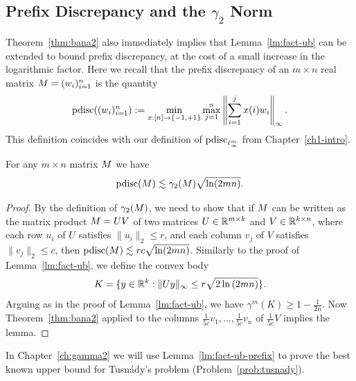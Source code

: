 


\subsection{Prefix Discrepancy and the $\gamma_2$ Norm}

Theorem~\ref{thm:bana2} also immediately implies that
Lemma~\ref{lm:fact-ub} can be extended to bound prefix discrepancy, at
the cost of a small increase in the logarithmic factor. Here we recall
that the prefix discrepancy of an $m\times n$ real matrix $M = (w_i)_{i=1}^n$ is
the quantity
\[
  \operatorname{pdisc}((w_i)_{i = 1}^n) :=
  \min_{x:[n]\to\{-1,+1\}}\max_{j=1}^n \left\|\sum_{i = 1}^jx(i)w_i \right\|_\infty.
\]
This definition coincides with our definition of
$\operatorname{pdisc}_{\ell_\infty^m}$ from Chapter~\ref{ch1-intro}.


\begin{lemma}\label{lm:fact-ub-prefix}
  For any $m\times n$ matrix $M$ 
  we have
  \[
  \operatorname{pdisc}(M) \lesssim \gamma_2(M) \sqrt{\ln(2mn)}.
  \]   
\end{lemma}
\begin{proof}
  By the definition of $\gamma_2(M)$, we need to show  that if $M$ can be written as the matrix
  product $M = UV$ of two matrices $U \in \mathbb{R}^{m\times k}$ and $V\in
  \mathbb{R}^{k\times n}$, where each row
  $u_i$ of $U$ satisfies $\|u_i\|_2 \le r$, and each column $v_j$ of
  $V$ satisfies $\|v_j\|_2 \le c$, then $\operatorname{pdisc}(M) \lesssim rc\sqrt{\ln(2mn)}$.
  Similarly to the proof of Lemma~\ref{lm:fact-ub}, we define the convex body
  \[
    K = \{ y \in \mathbb{R}^k: \|Uy \|_{\infty} \leq r\sqrt{2\ln{(2mn)}}  \}.
  \]
  Arguing as in the proof of Lemma~\ref{lm:fact-ub},
  we have $\gamma^m(K) \ge 1 - \frac{1}{2n}$.
  Now Theorem~\ref{thm:bana2} applied to the columns $\frac{1}{5c}v_1,
  \ldots, \frac{1}{5c}v_n$ of $\frac{1}{5c}V$ implies the lemma.
\end{proof}

In Chapter~\ref{ch:gamma2} we will use Lemma~\ref{lm:fact-ub-prefix}
to prove the best known upper bound for Tusn\'ady's problem (Problem~\ref{prob:tusnady}).

